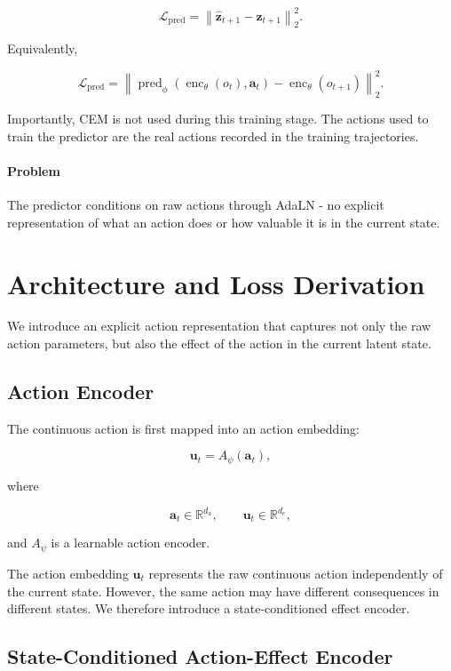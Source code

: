 ﻿\documentclass{article}
\begin{document}
\[
\mathcal{L}_{\mathrm{pred}}
=
\left\|
\hat{\mathbf{z}}_{t+1}
-
\mathbf{z}_{t+1}
\right\|_2^2.
\]

Equivalently,

\[
\mathcal{L}_{\mathrm{pred}}
=
\left\|
\operatorname{pred}_{\phi}
\left(
\operatorname{enc}_{\theta}(o_t),
\mathbf{a}_t
\right)
-
\operatorname{enc}_{\theta}(o_{t+1})
\right\|_2^2.
\]

Importantly, CEM is not used during this training stage. The actions used
to train the predictor are the real actions recorded in the training
trajectories.


\paragraph{Problem}
The predictor conditions on raw actions through AdaLN - no explicit representation of what an action does or how valuable it is in the current state.



\section{Architecture and Loss Derivation}

We introduce an explicit action representation that captures not only the
raw action parameters, but also the effect of the action in the current
latent state.

\subsection{Action Encoder}

The continuous action is first mapped into an action embedding:

\[
\mathbf{u}_t
=
A_{\psi}(\mathbf{a}_t),
\]

where

\[
\mathbf{a}_t \in \mathbb{R}^{d_a},
\qquad
\mathbf{u}_t \in \mathbb{R}^{d_e},
\]

and \(A_{\psi}\) is a learnable action encoder.

The action embedding \(\mathbf{u}_t\) represents the raw continuous
action independently of the current state. However, the same action may
have different consequences in different states. We therefore introduce
a state-conditioned effect encoder.

\subsection{State-Conditioned Action-Effect Encoder}
\end{document}
